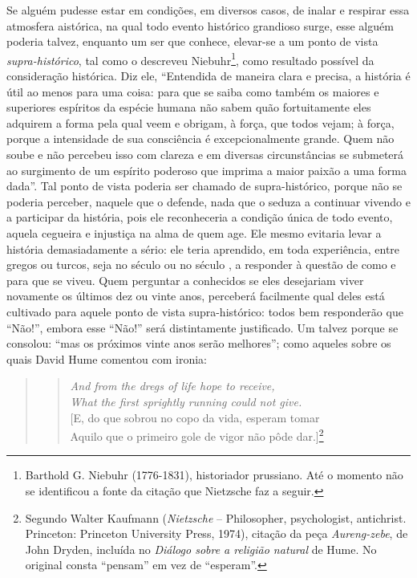 Se alguém pudesse estar em condições, em diversos casos, de inalar e
respirar essa atmosfera aistórica, na qual todo evento histórico
grandioso surge, esse alguém poderia talvez, enquanto um ser que
conhece, elevar-se a um ponto de vista \emph{supra-histórico}, tal como
o descreveu Niebuhr\footnote{Barthold G. Niebuhr (1776-1831),
  historiador prussiano. Até o momento não se identificou a fonte da
  citação que Nietz\-sche faz a seguir.}, como resultado possível da
consideração histórica. Diz ele, ``Entendida de maneira clara e precisa,
a história é útil ao menos para uma coisa: para que se saiba como também
os maiores e superiores espíritos da espécie humana não sabem quão
fortuitamente eles adquirem a forma pela qual veem e obrigam, à força,
que todos vejam; à força, porque a intensidade de sua consciência é
excepcionalmente grande. Quem não soube e não percebeu isso com clareza e em diversas
circunstâncias se submeterá ao surgimento de um espírito poderoso que
imprima a maior paixão a uma forma dada''. Tal ponto de vista poderia
ser chamado de supra-histórico, porque não se poderia perceber, naquele
que o defende, nada que o seduza a continuar vivendo e a participar da
história, pois ele reconheceria a condição única de todo evento, aquela
cegueira e injustiça na alma de quem age. Ele mesmo evitaria levar a
história demasiadamente a sério: ele teria aprendido, em toda
experiência, entre gregos ou turcos, seja no século  ou no século ,
a responder à questão de como e para que se viveu. Quem perguntar a
conhecidos se eles desejariam viver novamente os últimos dez ou vinte
anos, perceberá facilmente qual deles está cultivado para aquele ponto
de vista supra-histórico: todos bem responderão que ``Não!'', embora
esse ``Não!'' será distintamente justificado. Um talvez porque se
consolou: ``mas os próximos vinte anos serão melhores''; como aqueles
sobre os quais David Hume comentou com ironia:

\begin{quote}
\begin{verse}
\emph{And from the dregs of life hope to receive,}\\
\emph{What the first sprightly running could not give.}\\
{[}E, do que sobrou no copo da vida, esperam tomar\\
Aquilo que o primeiro gole de vigor não pôde dar.{]}\footnote{Segundo
  Walter Kaufmann (\emph{Nietz\-sche} -- Philosopher, psychologist,
  antichrist. Princeton: Princeton University Press, 1974),
  citação da peça \emph{Aureng-zebe}, de John Dryden, incluída no
  \emph{Diálogo sobre a religião natural} de Hume. No original consta
  ``pensam'' em vez de ``esperam''.}
\end{verse}
\end{quote}

